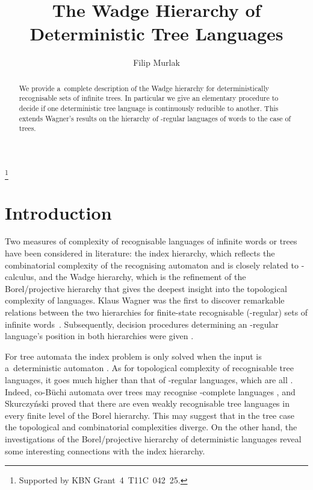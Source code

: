 \documentclass{LMCS}
\begin{document}
\title{The Wadge Hierarchy of Deterministic Tree Languages\rsuper*}

\author[F.~Murlak]{Filip Murlak}

\address{Institute of Informatics, University of Warsaw, ul.~Banacha
  2, 02--097 Warszawa, Poland}


\thanks{Supported by KBN Grant~4~T11C~042~25.}






\begin{abstract} 
We provide a~complete description of the Wadge hierarchy for
deterministically recognisable sets of infinite trees. In particular
we give an elementary procedure to decide if one deterministic tree
language is continuously reducible to another. This extends Wagner's
results on the hierarchy of -regular languages of words to the
case of trees. 
\end{abstract}

\maketitle


\section{Introduction}

Two measures of complexity of recognisable languages of infinite words
or trees have been considered in literature: the index hierarchy,
which reflects the combinatorial complexity of the recognising
automaton and is closely related to -calculus, and the Wadge
hierarchy, which is the refinement of the Borel/projective hierarchy
that gives the deepest insight into the topological complexity of
languages. Klaus Wagner was the first to discover remarkable relations
between the two hierarchies for finite-state recognisable
(-regular) sets of infinite
words~\cite{wagner0}. Subsequently, decision procedures determining an
-regular language's position in both hierarchies were given
\cite{kupferman,kwiatek,wagner}.

For tree automata the index problem is only solved when the input is
a~deterministic automaton \cite{hie,urban}. As for topological
complexity of recognisable tree languages, it goes much higher than
that of -regular languages, which are all
. Indeed, co-B\"uchi automata over trees may recognise
-complete languages \cite{gap}, and Skurczy\'nski
\cite{skurcz} proved that there are even weakly recognisable tree
languages in every finite level of the Borel hierarchy. This may
suggest that in the tree case the topological and combinatorial
complexities diverge. On the other hand, the investigations of the
Borel/projective hierarchy of deterministic languages \cite{split,gap}
reveal some interesting connections with the index hierarchy.
\end{document}
